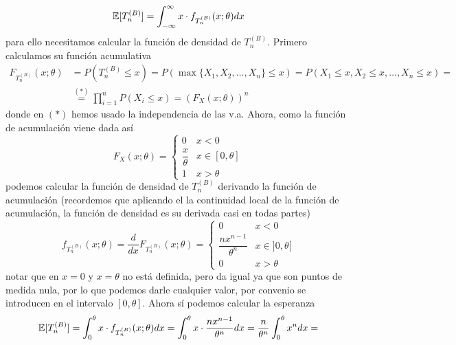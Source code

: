 \begin{ejemplo}[Libro 7.3]
\begin{itemize}
        \begin{equation*}
            \mathbb{E}[T_n^{(B)}] = \int_{-\infty}^{\infty} x \cdot f_{T_n^{(B)}}(x;\theta) dx
        \end{equation*}
        para ello necesitamos calcular la función de densidad de $T_n^{(B)}$. Primero calculamos su función acumulativa
        \begin{align*}
            F_{T_n^{(B)}}(x;\theta) &= P(T_n^{(B)} \leq x) = P(\max\{X_1, X_2, \ldots, X_n\} \leq x) = P(X_1 \leq x, X_2 \leq x, \ldots, X_n \leq x) = \\
            &\overset{(*)}{=} \prod\limits_{i=1}^{n} P(X_i \leq x) = (F_{X}(x;\theta))^n
        \end{align*}
        donde en $(*)$ hemos usado la independencia de las v.a. Ahora, como la función de acumulación viene dada así
        \begin{equation*}
            F_{X}(x;\theta) = \begin{cases}
                0 & x < 0 \\
                \dfrac{x}{\theta} & x \in [0,\theta] \\
                1 & x > \theta
            \end{cases}
        \end{equation*}
        podemos calcular la función de densidad de $T_n^{(B)}$ derivando la función de acumulación (recordemos que aplicando el la continuidad local de la función de acumulación, la función de densidad es su derivada casi en todas partes)
        \begin{equation*}
            f_{T_n^{(B)}}(x;\theta) = \dfrac{d}{dx} F_{T_n^{(B)}}(x;\theta) = \begin{cases}
                0 & x < 0 \\
                \dfrac{n x^{n-1}}{\theta^n} & x \in ]0,\theta[ \\
                0 & x > \theta
            \end{cases}
        \end{equation*}
        notar que en $x=0$ y $x=\theta$ no está definida, pero da igual ya que son puntos de medida nula, por lo que podemos darle cualquier valor, por convenio se introducen en el intervalo $[0,\theta]$. Ahora sí podemos calcular la esperanza
        \begin{align*}
            \E[T_n^{(B)}] &= \int_{0}^{\theta} x \cdot f_{T_n^{(B)}}(x;\theta) dx = \int_{0}^{\theta} x \cdot \dfrac{n x^{n-1}}{\theta^n} dx = \dfrac{n}{\theta^n} \int_{0}^{\theta} x^n dx = \\

\end{align*}
\end{itemize}
\end{ejemplo}
